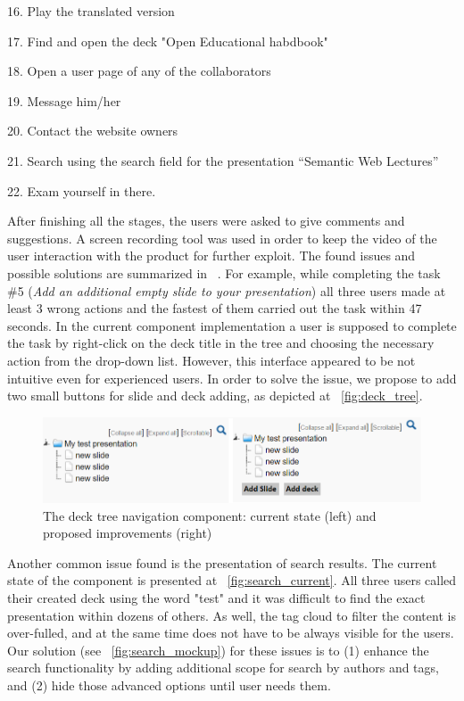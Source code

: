 \documentclass[ngerman,UKenglish,table]{scrbook}
\begin{document}
16. Play the translated version

17. Find and open the deck "Open Educational habdbook"

18. Open a user page of any of the collaborators

19. Message him/her

20. Contact the website owners

21. Search using the search field for the presentation “Semantic Web Lectures”

22. Exam yourself in there.


After finishing all the stages, the users were asked to give comments and suggestions.
A screen recording tool was used in order to keep the video of the user interaction with the product for further exploit.
The found issues and possible solutions are summarized in ~\cite{hasanov2015measuring}. 
For example, while completing the task \#5 (\textit{Add an additional empty slide to your presentation}) all three users made at least 3 wrong actions and the fastest of them carried out the task within 47 seconds. 
In the current component implementation a user is supposed to complete the task by right-click on the deck title in the tree and choosing the necessary action from the drop-down list. 
However, this interface appeared to be not intuitive even for experienced users.
In order to solve the issue, we propose to add two small buttons for slide and deck adding, as depicted at ~\autoref{fig:deck_tree}.

\begin{figure}[ht!]
	\centering
		\includegraphics[width=\columnwidth]{images/deck_tree_mockup.png}
	\caption{The deck tree navigation component: current state (left) and proposed improvements (right)}
	\label{fig:deck_tree}
\end{figure}

Another common issue found is the presentation of search results.
The current state of the component is presented at ~\autoref{fig:search_current}.
All three users called their created deck using the word "test" and it was difficult to find the exact presentation within dozens of others.
As well, the tag cloud to filter the content is over-fulled, and at the same time does not have to be always visible for the users.
Our solution (see ~\autoref{fig:search_mockup}) for these issues is to (1) enhance the search functionality by adding additional scope for search by authors and tags, and (2) hide those advanced options until user needs them. 
\end{document}
